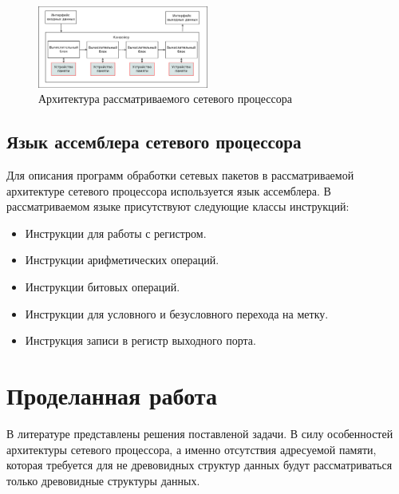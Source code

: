 \documentclass[conference]{IEEEtran}
\begin{document}
        \begin{figure}[h]
            \includegraphics[width=0.5\textwidth]{npu_all.png}
            \caption{Архитектура рассматриваемого сетевого процессора}
        \end{figure}
        
        \subsection{Язык ассемблера сетевого процессора}
            Для описания программ обработки сетевых пакетов в рассматриваемой архитектуре сетевого процессора используется язык ассемблера. 
            В рассматриваемом языке присутствуют следующие классы инструкций:
            \begin{itemize}
                \item Инструкции для работы с регистром.
                \item Инструкции арифметических операций.
                \item Инструкции битовых операций.
                \item Инструкции для условного и безусловного перехода на метку.
                \item Инструкция записи в регистр выходного порта.
            \end{itemize}
    \section{Проделанная работа}
        В литературе представлены решения поставленой задачи. 
        В силу особенностей архитектуры сетевого процессора, а именно отсутствия 
        адресуемой памяти, 
        которая требуется для не древовидных структур данных будут рассматриваться 
        только древовидные структуры данных. 
        
\end{document}
